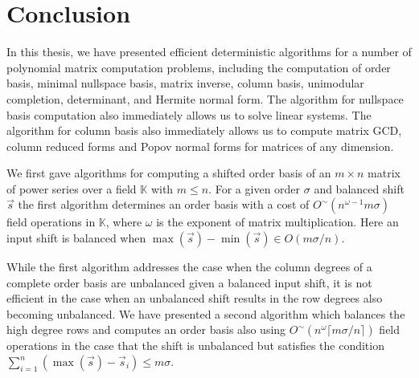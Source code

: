
\chapter{Conclusion\label{sec:Future-Research}}

In this thesis, we have presented efficient deterministic algorithms
for a number of polynomial matrix computation problems, including
the computation of order basis, minimal nullspace basis, matrix inverse,
column basis, unimodular completion, determinant, and Hermite normal
form. The algorithm for nullspace basis computation also immediately
allows us to solve linear systems. The algorithm for column basis
also immediately allows us to compute matrix GCD, column reduced forms
and Popov normal forms for matrices of any dimension. 

We first gave algorithms for computing a shifted order basis of an
$m\times n$ matrix of power series over a field $\mathbb{K}$ with
$m\le n$. For a given order $\sigma$ and balanced shift $\vec{s}$
the first algorithm determines an order basis with a cost of $O^{\sim}(n^{\omega-1}m\sigma)$
field operations in $\mathbb{K}$, where $\omega$ is the exponent
of matrix multiplication. Here an input shift is balanced when $\max(\vec{s})-\min(\vec{s})\in O(m\sigma/n)$.
\begin{comment}
This extends earlier work of Storjohann which only determines a subset
of an order basis that is within a specified degree bound $\delta$
using $O^{\sim}(n^{\omega}\delta)$ field operations for $\delta\ge\lceil m\sigma/n\rceil$.
\end{comment}
{} While the first algorithm addresses the case when the column degrees
of a complete order basis are unbalanced given a balanced input shift,
it is not efficient in the case when an unbalanced shift results in
the row degrees also becoming unbalanced. %
We have presented a second algorithm which balances the high degree
rows and computes an order basis also using $O^{\sim}(n^{\omega}\lceil m\sigma/n\rceil)$
field operations in the case that the shift is unbalanced but satisfies
the condition $\sum_{i=1}^{n}(\max(\vec{s})-\vec{s}_{i})\le m\sigma$.%
